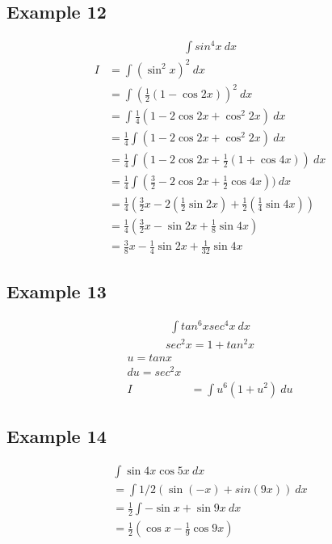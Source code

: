 \documentclass{article}
\theoremstyle{mytheoremstyle}
\theoremstyle{mytheoremstyle}
\theoremstyle{myproblemstyle}
\begin{document}
    \subsection*{Example 12}
    \begin{align*}
        \int sin^4 x \ dx
    \end{align*}
    \begin{align*}
        I &= \int (\sin^2 x)^2 \ dx \\
        &= \int (\frac{1}{2} (1-\cos 2x))^2 \ dx \\
        &= \int \frac{1}{4} (1 - 2\cos 2x + \cos^2 2x) \ dx \\
        &= \frac{1}{4} \int (1 - 2\cos 2x + \cos^2 2x) \ dx \\
        &= \frac{1}{4} \int (1 - 2\cos 2x + \frac{1}{2} (1+\cos 4x)) \ dx \\
        &= \frac{1}{4} \int (\frac{3}{2} - 2\cos 2x + \frac{1}{2} \cos 4x)) \ dx \\
        &= \frac{1}{4} (\frac{3}{2} x - 2 (\frac{1}{2} \sin 2x) + \frac{1}{2} (\frac{1}{4} \sin 4x)) \\
        &= \frac{1}{4} (\frac{3}{2} x - \sin 2x + \frac{1}{8} \sin 4x) \\
        &= \frac{3}{8} x - \frac{1}{4} \sin 2x + \frac{1}{32} \sin 4x
    \end{align*}

    \subsection*{Example 13}
    \begin{align*}
        \int tan^6 x sec^4 x \ dx
    \end{align*}
    \begin{align*}
        sec^2 x = 1 + tan^2 x
    \end{align*}
    \begin{align*}
        u = tan x \\
        du = sec^2 x \\
        I &= \int u^6 (1+u^2) \ du
    \end{align*}

    \subsection*{Example 14}
    \begin{align*}
        \int \sin 4x \cos 5x \ dx \\
        = \int 1/2 (\sin(-x) + sin(9x)) \ dx \\
        = \frac{1}{2} \int - \sin x + \sin 9x \ dx \\
        = \frac{1}{2} (\cos x - \frac{1}{9} \cos 9x)
    \end{align*}
\end{document}
